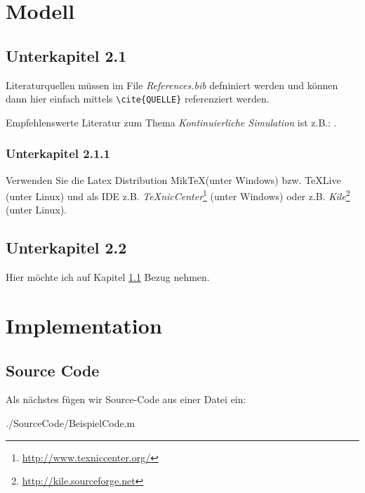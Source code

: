 \documentclass[a4paper,11pt]{scrartcl}
\begin{document}
\section{Modell}

\subsection{Unterkapitel 2.1}
\label{sec:Unterkapitel21}
 Literaturquellen müssen im File \textit{References.bib} defniniert werden und können
 dann hier einfach mittels \verb|\cite{QUELLE}| referenziert werden.

 Empfehlenswerte Literatur zum Thema \emph{Kontinuierliche Simulation} ist z.B.:
 \cite{CK06}.

\subsubsection{Unterkapitel 2.1.1}
 Verwenden Sie die Latex Distribution Mik\TeX (unter Windows) bzw. \TeX  Live (unter Linux)
 und als IDE z.B. \emph{\TeX nicCenter}\footnote{\url{http://www.texniccenter.org/}} (unter Windows)
 oder z.B. \emph{Kile}\footnote{\url{http://kile.sourceforge.net}} (unter Linux).

\subsection{Unterkapitel 2.2}
Hier möchte ich auf Kapitel \ref{sec:Unterkapitel21} Bezug nehmen.

\section{Implementation}

\subsection{Source Code}

Als nächstes fügen wir Source-Code aus einer Datei ein:

  {./SourceCode/BeispielCode.m}
\end{document}
